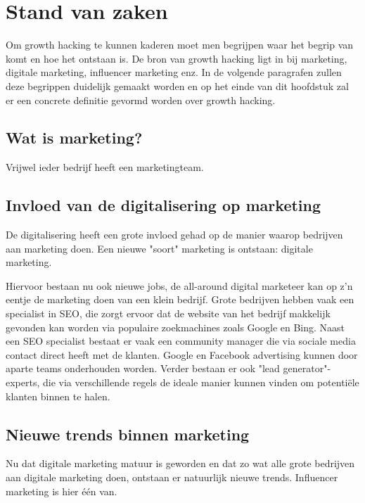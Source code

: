\chapter{Stand van zaken}
\label{ch:stand-van-zaken}


Om growth hacking te kunnen kaderen moet men begrijpen waar het begrip van komt en hoe het ontstaan is. De bron van growth hacking ligt in bij marketing, digitale marketing, influencer marketing enz. In de volgende paragrafen zullen deze begrippen duidelijk gemaakt worden en op het einde van dit hoofdstuk zal er een concrete definitie gevormd worden over growth hacking.

\section{Wat is marketing?}
\label{sec:marketing}
Vrijwel ieder bedrijf heeft een marketingteam.

\section{Invloed van de digitalisering op marketing}
\label{sec:digitalisering-marketing}
De digitalisering heeft een grote invloed gehad op de manier waarop bedrijven aan marketing doen. Een nieuwe "soort" marketing is ontstaan: digitale marketing. 

Hiervoor bestaan nu ook nieuwe jobs, de all-around digital marketeer kan op z'n eentje de marketing doen van een klein bedrijf. Grote bedrijven hebben vaak een specialist in SEO, die zorgt ervoor dat de website van het bedrijf makkelijk gevonden kan worden via populaire zoekmachines zoals Google en Bing. Naast een SEO specialist bestaat er vaak een community manager die via sociale media contact direct heeft met de klanten. Google en Facebook advertising kunnen door aparte teams onderhouden worden. Verder bestaan er ook "lead generator"-experts, die via verschillende regels de ideale manier kunnen vinden om potentiële klanten binnen te halen.


\section{Nieuwe trends binnen marketing}
\label{sec:nieuwe-trends-marketing}
Nu dat digitale marketing matuur is geworden en dat zo wat alle grote bedrijven aan digitale marketing doen, ontstaan er natuurlijk nieuwe trends. Influencer marketing is hier één van. 

